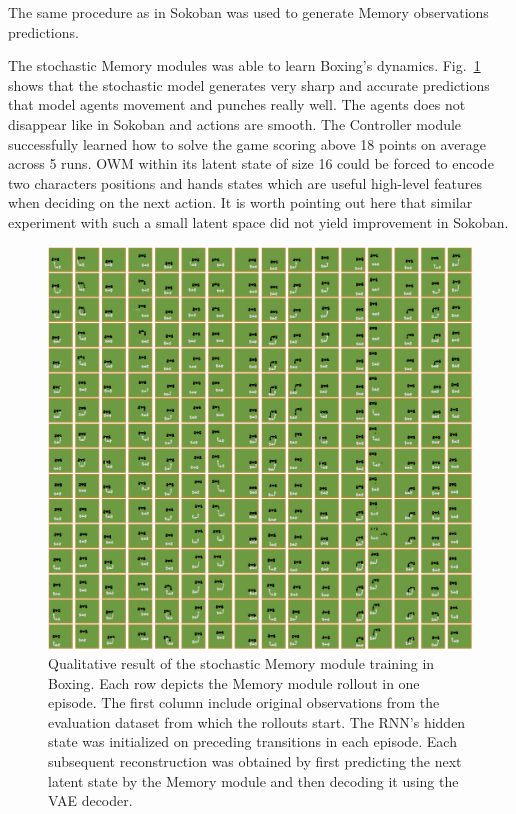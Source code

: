 The same procedure as in Sokoban was used to generate Memory observations predictions.

The stochastic Memory modules was able to learn Boxing’s dynamics. Fig.~\ref{Fig.WM_Boxing_memory} shows that the stochastic model generates very sharp and accurate predictions that model agents movement and punches really well. The agents does not disappear like in Sokoban and actions are smooth.
The Controller module successfully learned how to solve the game scoring above 18 points on average across 5 runs. OWM within its latent state of size 16 could be forced to encode two characters positions and hands states which are useful high-level features when deciding on the next action. It is worth pointing out here that similar experiment with such a small latent space did not yield improvement in Sokoban.

\begin{figure}[H]
\includegraphics[width=1\textwidth,keepaspectratio]{figures/Boxing_memory.png}
\caption[Qualitative result of the World Models' stochastic Memory module training in Boxing]{Qualitative result of the stochastic Memory module training in Boxing. Each row depicts the Memory module rollout in one episode. The first column include original observations from the evaluation dataset from which the rollouts start. The RNN's hidden state was initialized on preceding transitions in each episode. Each subsequent reconstruction was obtained by first predicting the next latent state by the Memory module and then decoding it using the VAE decoder.}
\label{Fig.WM_Boxing_memory}
\end{figure}

